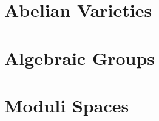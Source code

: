 \documentclass[sectionlevel=book]{noteformyself}
\begin{document}
    \chapter{Abelian Varieties}
        
        

    \chapter{Algebraic Groups}
        
        
        
        
        

    \chapter{Moduli Spaces}
        



    \printbibliography[heading=bibintoc, title={References}]
    
\end{document}
